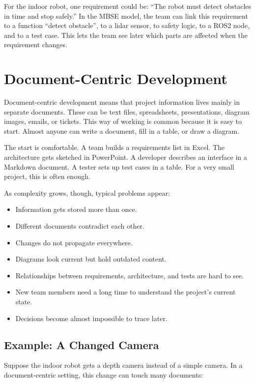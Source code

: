 \begin{praxisbox}
For the indoor robot, one requirement could be: \enquote{The robot must detect obstacles in time and stop safely.} In the MBSE model, the team can link this requirement to a function \enquote{detect obstacle}, to a lidar sensor, to safety logic, to a ROS2 node, and to a test case. This lets the team see later which parts are affected when the requirement changes.
\end{praxisbox}

\section{Document-Centric Development}
Document-centric development means that project information lives mainly in separate documents. These can be text files, spreadsheets, presentations, diagram images, emails, or tickets. This way of working is common because it is easy to start. Almost anyone can write a document, fill in a table, or draw a diagram.

The start is comfortable. A team builds a requirements list in Excel. The architecture gets sketched in PowerPoint. A developer describes an interface in a Markdown document. A tester sets up test cases in a table. For a very small project, this is often enough.

As complexity grows, though, typical problems appear:

\begin{itemize}
    \item Information gets stored more than once.
    \item Different documents contradict each other.
    \item Changes do not propagate everywhere.
    \item Diagrams look current but hold outdated content.
    \item Relationships between requirements, architecture, and tests are hard to see.
    \item New team members need a long time to understand the project's current state.
    \item Decisions become almost impossible to trace later.
\end{itemize}

\subsection{Example: A Changed Camera}
Suppose the indoor robot gets a depth camera instead of a simple camera. In a document-centric setting, this change can touch many documents:

